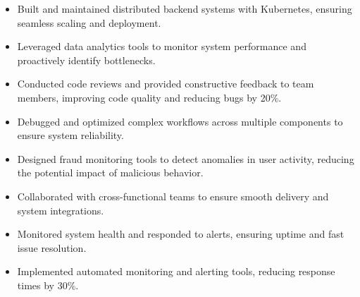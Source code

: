 \par\smallskip
\noindent
\begin{minipage}{20cm}
  \begin{minipage}{9.75cm}
    \begin{itemize}
      \item Built and maintained distributed backend systems with Kubernetes, ensuring seamless scaling and deployment.
      \item Leveraged data analytics tools to monitor system performance and proactively identify bottlenecks.
    \end{itemize}
  \end{minipage}
  \hfill
  \begin{minipage}{9.75cm}
    \begin{itemize}
      \item Conducted code reviews and provided constructive feedback to team members, improving code quality and reducing bugs by 20\%.
      \item Debugged and optimized complex workflows across multiple components to ensure system reliability.
    \end{itemize}
  \end{minipage}
\end{minipage}
\par\smallskip
\divider

\par\smallskip
\noindent
\begin{minipage}{20cm}
  \begin{minipage}{9.75cm}
    \begin{itemize}
      \item Designed fraud monitoring tools to detect anomalies in user activity, reducing the potential impact of malicious behavior.
      \item Collaborated with cross-functional teams to ensure smooth delivery and system integrations.
    \end{itemize}
  \end{minipage}
  \hfill
  \begin{minipage}{9.75cm}
    \begin{itemize}
      \item Monitored system health and responded to alerts, ensuring uptime and fast issue resolution.
      \item Implemented automated monitoring and alerting tools, reducing response times by 30\%.
    \end{itemize}
  \end{minipage}
\end{minipage}

